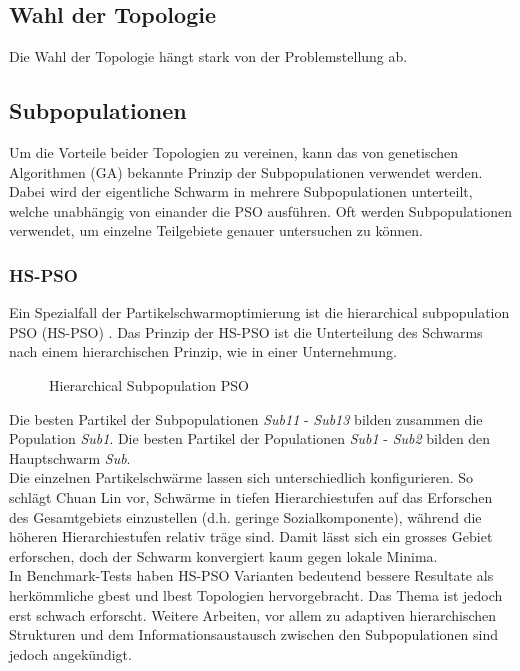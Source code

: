 \subsection{Wahl der Topologie}
Die Wahl der Topologie hängt stark von der Problemstellung ab. 

\subsection{Subpopulationen}
Um die Vorteile beider Topologien zu vereinen, kann das von genetischen Algorithmen (GA) bekannte Prinzip der Subpopulationen verwendet werden. Dabei wird der eigentliche Schwarm in mehrere Subpopulationen unterteilt, welche unabhängig von einander die PSO ausführen. Oft werden Subpopulationen verwendet, um einzelne Teilgebiete genauer untersuchen zu können.

\newpage

\subsubsection{HS-PSO}
Ein Spezialfall der Partikelschwarmoptimierung ist die hierarchical subpopulation PSO (HS-PSO) \cite{ChuanLin-HSPSO}. Das Prinzip der HS-PSO ist die Unterteilung des Schwarms nach einem hierarchischen Prinzip, wie in einer Unternehmung.

\begin{figure}[htbp]
	\centering
	
	\caption{Hierarchical Subpopulation PSO}
	\label{hs-pso}
\end{figure}

Die besten Partikel der Subpopulationen \textit{Sub11} - \textit{Sub13} bilden zusammen die Population \textit{Sub1}. Die besten Partikel der Populationen \textit{Sub1} - \textit{Sub2} bilden den Hauptschwarm \textit{Sub}. \\

Die einzelnen Partikelschwärme lassen sich unterschiedlich konfigurieren. So schlägt Chuan Lin vor, Schwärme in tiefen Hierarchiestufen auf das Erforschen des Gesamtgebiets einzustellen (d.h. geringe Sozialkomponente), während die höheren Hierarchiestufen relativ träge sind. Damit lässt sich ein grosses Gebiet erforschen, doch der Schwarm konvergiert kaum gegen lokale Minima. \\

In Benchmark-Tests haben HS-PSO Varianten bedeutend bessere Resultate als herkömmliche gbest und lbest Topologien hervorgebracht. Das Thema ist jedoch erst schwach erforscht. Weitere Arbeiten, vor allem zu adaptiven hierarchischen Strukturen und dem Informationsaustausch zwischen den Subpopulationen sind jedoch angekündigt.

